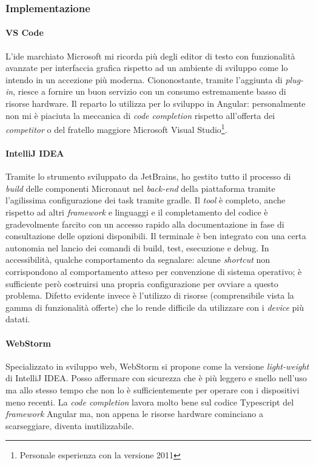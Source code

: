 \subsubsection{Implementazione}
\paragraph{VS Code}
L'\acrshort{ide} marchiato Microsoft mi ricorda più degli editor di testo con funzionalità avanzate per interfaccia grafica rispetto ad un ambiente di sviluppo come lo intendo in un accezione più moderna. Ciononostante, tramite l'aggiunta di \textit{plug-in}, riesce a fornire un buon servizio con un consumo estremamente basso di risorse hardware.
Il reparto lo utilizza per lo sviluppo in Angular: personalmente non mi è piaciuta la meccanica di \textit{code completion} rispetto all'offerta dei \textit{competitor} o del fratello maggiore Microsoft Visual Studio\footnote{Personale esperienza con la versione 2011}.
\paragraph{IntelliJ IDEA}
Tramite lo strumento sviluppato da JetBrains, ho gestito tutto il processo di \textit{build} delle componenti Micronaut nel \textit{back-end} della piattaforma tramite l'agilissima configurazione dei task tramite \gls{gradle}. Il \textit{tool} è completo, anche rispetto ad altri \textit{framework} e linguaggi e il completamento del codice è gradevolmente farcito con un accesso rapido alla documentazione in fase di consultazione delle opzioni disponibili. Il terminale è ben integrato con una certa autonomia nel lancio dei comandi di build, test, esecuzione e debug. In accessibilità, qualche comportamento da segnalare: alcune \textit{shortcut} non corrispondono al comportamento atteso per convenzione di sistema operativo; è sufficiente però costruirsi una propria configurazione per ovviare a questo problema. Difetto evidente invece è l'utilizzo di risorse (comprensibile vista la gamma di funzionalità offerte) che lo rende difficile da utilizzare con i \textit{device} più datati.
\paragraph{WebStorm}
Specializzato in sviluppo web, WebStorm si propone come la versione \textit{light-weight} di IntelliJ IDEA. Posso affermare con sicurezza che è più leggero e snello nell'uso ma allo stesso tempo che non lo è sufficientemente per operare con i dispositivi meno recenti. La \textit{code completion} lavora molto bene sul codice Typescript del \textit{framework} Angular ma, non appena le risorse hardware cominciano a scarseggiare, diventa inutilizzabile.


